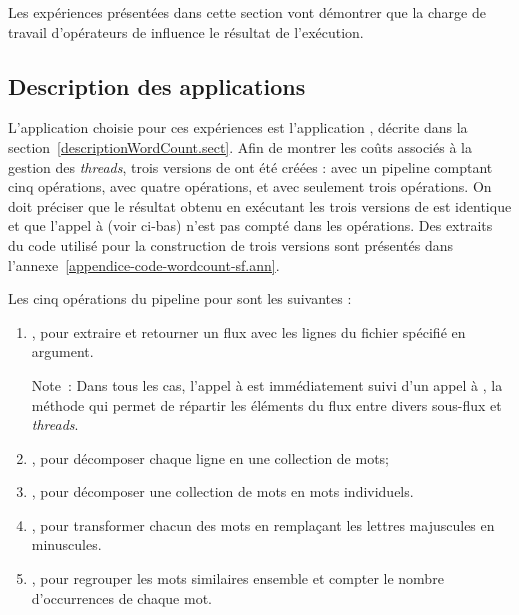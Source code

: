 Les exp\'eriences présentées dans cette section vont d\'emontrer que la charge de travail d'opérateurs de  influence le r\'esultat de l'ex\'ecution.


\subsection{Description des applications}


L'application choisie pour ces exp\'eriences est l'application , d\'ecrite dans la section~\ref{descriptionWordCount.sect}. Afin de montrer les coûts associés à la gestion des \emph{threads}, trois versions de  ont \'et\'e cr\'e\'ees :  avec un pipeline comptant cinq op\'erations,  avec quatre opérations, et  avec seulement trois op\'erations. On doit pr\'eciser que le r\'esultat obtenu en ex\'ecutant les trois versions de  est identique et que l'appel à  (voir ci-bas) n'est pas compté dans les opérations. Des extraits du code utilis\'e pour la construction de trois versions sont pr\'esent\'es dans l'annexe~\ref{appendice-code-wordcount-sf.ann}. 

\goodbreak
Les cinq op\'erations du pipeline pour  sont les suivantes :
\begin{enumerate}
\item {}, pour extraire et retourner un flux avec les lignes du fichier sp\'ecifi\'e en argument.

Note~: Dans tous les cas, l'appel à  est immédiatement suivi d'un appel à , la m\'ethode qui permet de r\'epartir les \'el\'ements du flux entre divers sous-flux et \emph{threads}.

\item {}, pour d\'ecomposer chaque ligne en une collection de mots;

\item {}, pour d\'ecomposer une collection de mots en mots individuels.

\item {}, pour transformer chacun des mots en rempla\c{c}ant les lettres majuscules en minuscules.

\item {}, pour regrouper les mots similaires ensemble et compter le nombre d'occurrences de chaque mot.
\end{enumerate}

